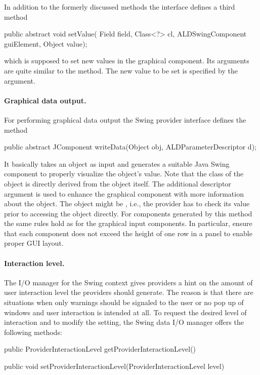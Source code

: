 In addition to the formerly discussed methods the interface defines a third method
\vspace*{0.5cm}
\begin{code}
  public abstract void setValue(
      Field field, Class<?> cl, ALDSwingComponent guiElement, Object value);
\end{code}

\vspace*{-0.25cm}
which is supposed to set new values in the graphical component. Its arguments are quite similar 
to the  method. The new value to be set is
specified by the  argument.

\paragraph{Graphical data output.} For performing graphical data output the
Swing provider interface defines the method
\vspace*{0.5cm}
\begin{code}
  public abstract JComponent writeData(Object obj, ALDParameterDescriptor d);
\end{code}

\vspace*{-0.25cm}
It basically takes an object  as input and generates a suitable
Java Swing component to properly visualize the object's value. Note that the class of the object is directly derived from 
the object itself. The additional descriptor argument is used to enhance the graphical component
with more information about the object. The object might be ,
i.e., the provider has to check its value prior to accessing the object
directly. For components generated by this method the same rules hold as for the graphical input components. In particular, ensure that each component does not exceed the height of one row in a panel to enable proper GUI layout.

\paragraph{Interaction level.} 
The I/O manager for the Swing context gives providers a hint on the amount of
user interaction level the providers should generate.
The reason is that 
there are situations when only warnings should be signaled to the user or no
pop up of windows and user interaction is intended at all. To request the
desired level of interaction and to modify the setting, the Swing data I/O
manager offers the following methods:
\vspace*{0.5cm}
\begin{code}
 public ProviderInteractionLevel getProviderInteractionLevel()

 public void setProviderInteractionLevel(ProviderInteractionLevel level)
\end{code}

